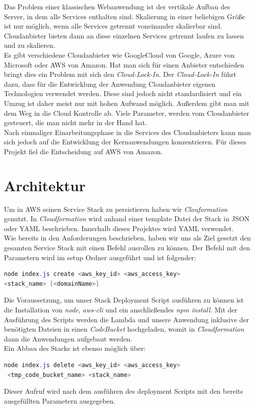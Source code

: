 \documentclass[a4paper, 12pt]{scrreprt}
\renewcommand\_{\textunderscore\allowbreak}
\begin{document}
Das Problem einer klassischen Webanwendung ist der vertikale Aufbau des Server, in dem alle Services enthalten sind. Skalierung in einer beliebigen Größe ist nur möglich, wenn alle Services getrennt voneinander skalierbar sind. Cloudanbieter bieten dann an diese einzelnen Services getrennt laufen zu lassen und zu skalieren. \\
Es gibt verschiedene Cloudanbieter wie GoogleCloud von Google, Azure von Microsoft oder AWS von Amazon. Hat man sich für einen Anbieter entschieden bringt dies ein Problem mit sich den \textit{Cloud-Lock-In}. Der \textit{Cloud-Lock-In} führt dazu, dass für die Entwicklung der Anwendung Cloudanbieter eigenen Technologien verwendet werden. Diese sind jedoch nicht standardisiert und ein Umzug ist daher meist nur mit hohen Aufwand möglich. Außerdem gibt man mit dem Weg in die Cloud Kontrolle ab. Viele Parameter, werden vom Cloudanbieter gesteuert, die man nicht mehr in der Hand hat.\\
Nach einmaliger Einarbeitungsphase in die Services des Cloudanbieters kann man sich jedoch auf die Entwicklung der Kernanwendungen konzentrieren. 
Für dieses Projekt fiel die Entscheidung auf AWS von Amazon.

\chapter{Architektur}
Um in AWS seinen Service Stack zu persistieren haben wir \textit{Clouformation} genutzt. In \textit{Cloudformation} wird anhand einer template Datei der Stack in JSON oder YAML beschrieben. Innerhalb dieses Projektes wird YAML verwendet.\\
Wie bereits in den Anforderungen beschrieben, haben wir uns als Ziel gesetzt den gesamten Service Stack mit einen Befehl ausrollen zu können. Der Befehl mit den Parametern wird im setup Ordner ausgeführt und ist folgender:

\bigskip
\begin{lstlisting}[xleftmargin=\parindent,frame=L,mathescape=true, basicstyle=\small, language=Java, lineskip={1.0pt}]
node index.js create <aws_key_id> <aws_access_key> 
<stack_name> [<domainName>]
\end{lstlisting}
\bigskip

\noindent Die Voraussetzung, um unser Stack Deployment Script ausführen zu können ist die Installation von \textit{node}, \textit{aws-cli} und ein anschließendes \textit{npm install}.
Mit der Ausführung des Scripts werden die Lambda und unsere Anwendung inklusive der benötigten Dateien in einen \textit{CodeBucket} hochgeladen, womit in \textit{Cloudformation} dann die Anwendungen aufgebaut werden.\\ Ein Abbau des Stacks ist ebenso möglich über:
\bigskip
\begin{lstlisting}[xleftmargin=\parindent,frame=L,mathescape=true, basicstyle=\small, language=Java, lineskip={1.0pt}]
node index.js delete <aws_key_id> <aws_access_key>
 <tmp_code_bucket_name> <stack_name>
\end{lstlisting}
\bigskip
Dieser Aufruf wird nach dem ausführen des deployment Scripts mit den bereits ausgefüllten Parametern ausgegeben.\\
\end{document}
